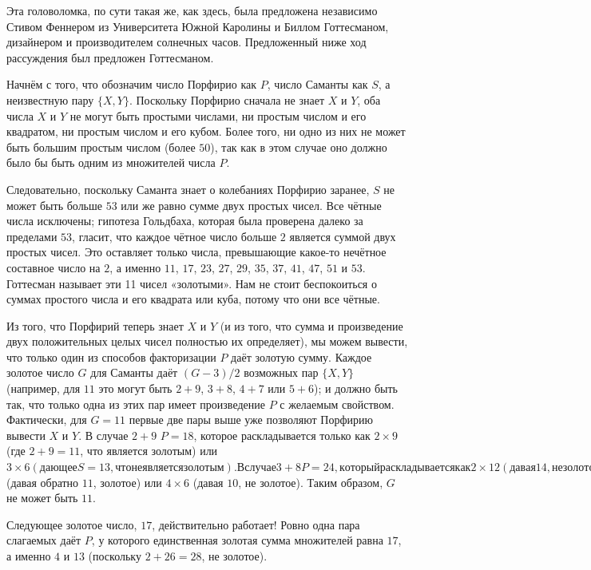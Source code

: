Эта головоломка, по сути такая же, как здесь, была предложена независимо Стивом Феннером из Университета Южной Каролины и Биллом Готтесманом, дизайнером и производителем солнечных часов. Предложенный ниже ход рассуждения был предложен Готтесманом.

Начнём с того, что обозначим число Порфирио как $P$, число Саманты как $S$, а неизвестную пару $\{X, Y\}$.
Поскольку Порфирио сначала не знает $X$ и $Y$, оба числа $X$ и $Y$ не могут быть простыми числами,
ни простым числом и его квадратом,
ни простым числом и его кубом.
Более того, ни одно из них не может быть большим простым числом (более $50$), так как в этом случае оно должно было бы быть одним из множителей числа $P$.

Следовательно, поскольку Саманта знает о колебаниях Порфирио заранее,
$S$ не может быть больше $53$ или же равно сумме двух простых чисел.
Все чётные числа исключены; гипотеза Гольдбаха, которая была проверена далеко за пределами $53$, гласит, что каждое чётное число больше $2$ является суммой двух простых чисел.
Это оставляет только числа, превышающие какое-то нечётное составное число на $2$, а именно $11$, $17$, $23$, $27$, $29$, $35$, $37$, $41$, $47$, $51$ и $53$.
Готтесман называет эти 11 чисел «золотыми».
Нам не стоит беспокоиться о суммах простого числа и его квадрата или куба, потому что они все чётные.

Из того, что Порфирий теперь знает $X$ и $Y$ (и из того, что сумма и произведение двух положительных целых чисел полностью их определяет), мы можем вывести, что только один из способов факторизации $P$ даёт золотую сумму. 
Каждое золотое число $G$ для Саманты даёт $(G - 3)/2$ возможных пар $\{X, Y\}$ (например, для $11$ это могут быть $2 + 9$, $3 + 8$, $4 + 7$ или $5 + 6$); и должно быть так, что только одна из этих пар имеет произведение $P$ с желаемым свойством.
Фактически, для $G = 11$ первые две пары выше уже позволяют Порфирию вывести $X$ и $Y$.
В случае $2 + 9$ $P = 18$, которое раскладывается только как $2 \times 9$ (где $2 + 9 = 11$, что является золотым) или $3 \times 6 (дающее S = 13, что не является золотым). В случае 3 + 8 P = 24, который раскладывается как 2 \times 12 (давая 14, не золотое) или 3 \times 8$ (давая обратно $11$, золотое) или $4 \times 6$ (давая $10$, не золотое).
Таким образом, $G$ не может быть $11$.

Следующее золотое число, $17$, действительно работает!
Ровно одна пара слагаемых даёт $P$, у которого единственная золотая сумма множителей равна $17$, а именно $4$ и $13$ (поскольку $2 + 26 = 28$, не золотое).

